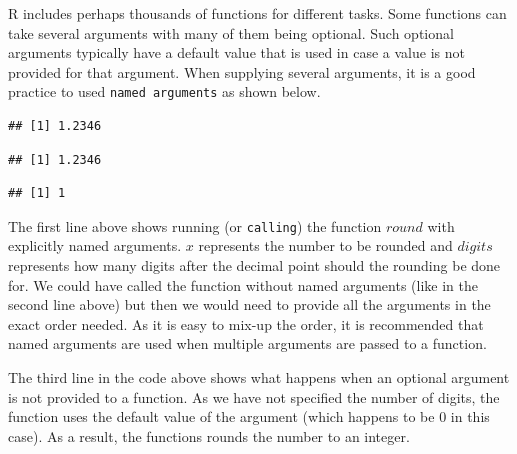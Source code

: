 \documentclass[11pt, letterpaper, twoside]{memoir}\usepackage{knitr}
\begin{document}
R includes perhaps thousands of functions for different tasks. Some functions can take several arguments with many of them being optional. Such optional arguments typically have a default value that is used in case a value is not provided for that argument. When supplying several  arguments, it is a good practice to used \texttt{named arguments} as shown below.

\begin{knitrout}
\color{fgcolor}\begin{kframe}
\begin{alltt}
\hlstd{(} \hlstd{=} \hlstd{,}  \hlstd{=} \hlstd{)}
\end{alltt}
\begin{verbatim}
## [1] 1.2346
\end{verbatim}
\begin{alltt}
\hlstd{(}\hlstd{,} \hlstd{)}
\end{alltt}
\begin{verbatim}
## [1] 1.2346
\end{verbatim}
\begin{alltt}
\hlstd{(}\hlstd{)}
\end{alltt}
\begin{verbatim}
## [1] 1
\end{verbatim}
\end{kframe}
\end{knitrout}

The first line above shows running (or \texttt{calling}) the function $round$  with explicitly named arguments. $x$ represents the number to be rounded and $digits$ represents how many digits after the decimal point should the rounding be done for. We could have called the function without named arguments (like in the second line above) but then we would need to provide all the arguments in the exact order needed. As it is easy to mix-up the order, it is recommended that named arguments are used when multiple arguments are passed to a function.

The third line in the code above shows what happens when an optional argument is not provided to a function. As we have not specified the number of digits, the function uses the default value of the argument (which happens to be $0$ in this case). As a result, the functions rounds the number to an integer.
\end{document}
